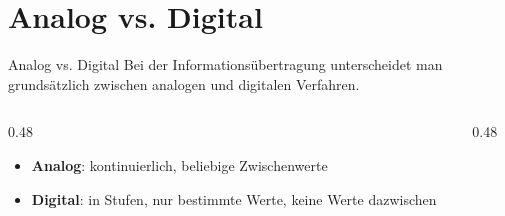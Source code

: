 
\section{Analog vs. Digital}
\label{section:analog_vs_digital}
\begin{frame}{Analog vs. Digital}%
    Bei der Informationsübertragung unterscheidet man grundsätzlich zwischen analogen und digitalen Verfahren.
    \begin{columns}
        \begin{column}{0.48\textwidth}
            \begin{itemize}
                \item<2-> \textbf{Analog}: kontinuierlich, beliebige Zwischenwerte
                \item<3-> \textbf{Digital}: in Stufen, nur bestimmte Werte, keine Werte dazwischen
            \end{itemize}
        \end{column}
        \begin{column}{0.48\textwidth}
        \end{column}
    \end{columns}
\end{frame}%